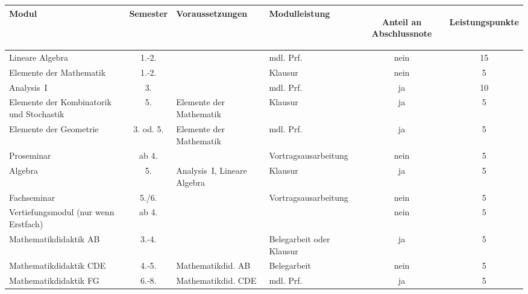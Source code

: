 \begin{table}[tbp]
	\begin{small}
		\begin{tabularx}{\textwidth}{|@{~}X@{~}|@{~}c@{~}|@{~}X@{~}|@{~}X@{~}|@{~}c@{~}|@{~}c@{~}|}
			\hline
			Modul & Semes\-ter & Voraus\-setzungen & Modul\-leistung & \begin{sideways}Anteil an Abschluss\-note \end{sideways}& \begin{sideways}Leistungspunkte\end{sideways}\\\hline\hline
			
			Lineare Algebra &1.-2.&&mdl. Prf.&nein&15\\\hline
			Elemente der Mathematik &1.-2.&&Klausur&nein&5\\\hline
			Analysis~I &3.&&mdl. Prf.&ja&10\\\hline
			Elemente der Kombinatorik und Stochastik &5.&Elemente der Mathematik&Klausur&ja&5\\\hline
			Elemente der Geometrie &3. od. 5.&Elemente der Mathematik&mdl. Prf.&ja&5\\\hline
			Proseminar & ab 4. & & Vortrags\-ausarbeitung &nein&5\\\hline
			Algebra & 5. &Analysis~I, Lineare Algebra & Klausur & ja & 5\\\hline
			
			Fachseminar & 5./6. & & Vortrags\-ausarbeitung & nein & 5\\\hline
			Ver\-tiefungs\-modul (nur wenn Erst\-fach)&ab 4.&&&nein&5\\\hline
			Mathe\-matik\-didaktik AB&3.-4.&&Beleg\-arbeit oder Klausur&ja&5\\\hline
			Mathe\-matik\-didaktik CDE&4.-5.&Mathe\-matikdid. AB&Beleg\-arbeit&nein&5\\\hline
			Mathe\-matik\-didaktik FG&6.-8.&Mathe\-matikdid. CDE&mdl. Prf.&ja&5\\\hline\hline
			

\end{tabularx}
\end{small}
\end{table}
